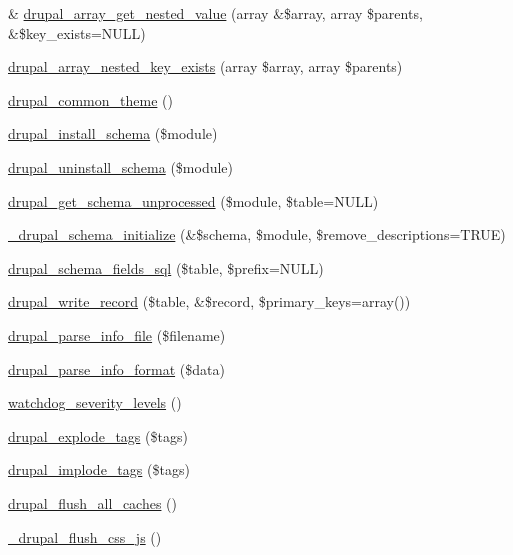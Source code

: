 \begin{DoxyCompactItemize}
\item 
\& \hyperlink{common_8inc_ab749143c8baa3aea4bae4ce125982d5f}{drupal\_\-array\_\-get\_\-nested\_\-value} (array \&\$array, array \$parents, \&\$key\_\-exists=NULL)
\item 
\hyperlink{common_8inc_a362d9c34bb8625f88e640906d457c0b4}{drupal\_\-array\_\-nested\_\-key\_\-exists} (array \$array, array \$parents)
\item 
\hyperlink{common_8inc_a1263ef82e0da5b85f8203783ed164872}{drupal\_\-common\_\-theme} ()
\item 
\hyperlink{group__schemaapi_ga9706b8d6ecdac10302d83bd50935a698}{drupal\_\-install\_\-schema} (\$module)
\item 
\hyperlink{group__schemaapi_ga0688b6627af9dc05f2618f81489c3db0}{drupal\_\-uninstall\_\-schema} (\$module)
\item 
\hyperlink{group__schemaapi_gaecb0d63f03b96dd1426298804e091d3b}{drupal\_\-get\_\-schema\_\-unprocessed} (\$module, \$table=NULL)
\item 
\hyperlink{group__schemaapi_gad4ce891e1e944b1d6eee7253448a0178}{\_\-drupal\_\-schema\_\-initialize} (\&\$schema, \$module, \$remove\_\-descriptions=TRUE)
\item 
\hyperlink{group__schemaapi_gaacfcd6f676ee9062f0ba50a008a05443}{drupal\_\-schema\_\-fields\_\-sql} (\$table, \$prefix=NULL)
\item 
\hyperlink{group__schemaapi_ga96f707de751a962bf21b6cb0cb4f2ae6}{drupal\_\-write\_\-record} (\$table, \&\$record, \$primary\_\-keys=array())
\item 
\hyperlink{common_8inc_a277955232059631211fcfde533ea89d6}{drupal\_\-parse\_\-info\_\-file} (\$filename)
\item 
\hyperlink{common_8inc_a21afcac6900bc25323023a53b9c3d100}{drupal\_\-parse\_\-info\_\-format} (\$data)
\item 
\hyperlink{group__logging__severity__levels_gafb5d4b58ec7e483153644c0f664e0ca4}{watchdog\_\-severity\_\-levels} ()
\item 
\hyperlink{common_8inc_ae5bd302bab285bc819a70737f6121953}{drupal\_\-explode\_\-tags} (\$tags)
\item 
\hyperlink{common_8inc_a29df41fde25e9fcace627a628806c978}{drupal\_\-implode\_\-tags} (\$tags)
\item 
\hyperlink{common_8inc_ac119432cefbdbb25647944d4ca3f82f8}{drupal\_\-flush\_\-all\_\-caches} ()
\item 
\hyperlink{common_8inc_aa53a3c794efc562f46a74688dabf27f6}{\_\-drupal\_\-flush\_\-css\_\-js} ()
\item 

\end{DoxyCompactItemize}
